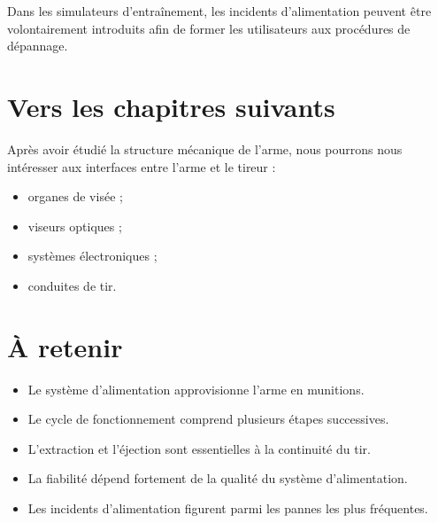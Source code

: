 \begin{simulation}

Dans les simulateurs d'entraînement, les incidents d'alimentation peuvent
être volontairement introduits afin de former les utilisateurs aux
procédures de dépannage.

\end{simulation}

\section{Vers les chapitres suivants}

Après avoir étudié la structure mécanique de l'arme, nous pourrons nous
intéresser aux interfaces entre l'arme et le tireur :

\begin{itemize}
    \item organes de visée ;
    \item viseurs optiques ;
    \item systèmes électroniques ;
    \item conduites de tir.
\end{itemize}

\section{À retenir}

\begin{aretenir}

\begin{itemize}
    \item Le système d'alimentation approvisionne l'arme en munitions.
    \item Le cycle de fonctionnement comprend plusieurs étapes successives.
    \item L'extraction et l'éjection sont essentielles à la continuité du
    tir.
    \item La fiabilité dépend fortement de la qualité du système
    d'alimentation.
    \item Les incidents d'alimentation figurent parmi les pannes les plus
    fréquentes.
\end{itemize}

\end{aretenir}

